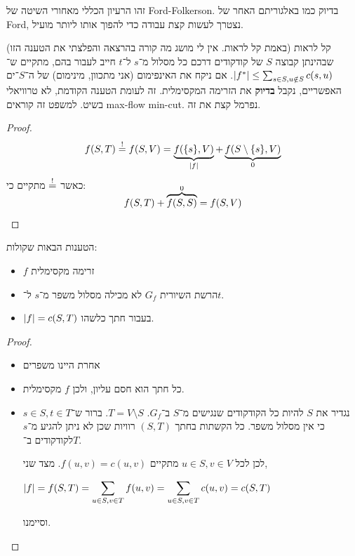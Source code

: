 \documentclass[]{../../../../tex/classes/styledArticle}
\begin{document}
	זהו הרעיון הכללי מאחורי השיטה של Ford-Folkerson. בדיוק כמו באלגוריתם האחר של Ford, נצטרך לעשות קצת עבודה כדי להפוך אותו ליותר מועיל. 
	
	קל לראות (באמת קל לראות. אין לי מושג מה קורה בהרצאה והפלצתי את הטענה הזו) שבהינתן קבוצה $S$ של קודקודים דרכם כל מסלול מ־$s$ ל־$t$ חייב לעבור בהם, מתקיים ש־$\left \lvert f^* \right \rvert \le \sum_{s \in S, u \notin S} c(s, u)$. 
	אם ניקח את האינפימום (אני מתכוון, מינימום) של ה־$S$־ים האפשריים, נקבל \textbf{בדיוק} את הזרימה המקסימלית. זה לעומת הטענה הקודמת, לא טרוויאלי בשיט. למשפט זה קוראים max-flow min-cut. נפרמל קצת את זה. 
	
	\begin{proof}
		\[ f(S, T) \overset{!}{=} f(S, V) = \underbrace{f(\{s\}, V)}_{\left \lvert f \right \rvert} + \underbrace{f(S \setminus \{s\}, V)}_{0} \]
		כאשר $\overset{!}{=}$ מתקיים כי: 
		\[ f(S, T) + \smash{\overbrace{f(S, S)}^{0}} = f(S, V) \]
	\end{proof}
	\begin{Theorem}
		הטענות הבאות שקולות: 
		\begin{itemize}
			\item $f$ זרימה מקסימלית
			\item הרשת השיורית $G_f$ לא מכילה מסלול משפר מ־$s$ ל־$t$. 
			\item $\left \lvert f \right \rvert = c(S, T)$ בעבור חתך כלשהו. 
		\end{itemize}
	\end{Theorem}
	\begin{proof}\,
		\begin{itemize}
			\item[$1 \implies 2$]אחרת היינו משפרים
			\item[$3 \implies 1$]כל חתך הוא חסם עליון, ולכן $f$ מקסימלית. 
			\item[$2 \implies 3$]נגדיר את $S$ להיות כל הקודקודים שנגישים מ־$S$ ב־$G_f$. $T = V \setminus S$. ברור ש־$s \in S, t \in T$ כי אין מסלול משפר. כל הקשתות בחתך $(S, T)$ רוויות שכן לא ניתן להגיע מ־$s$ לקודקודים ב־$T$. 
			
			לכן לכל $u \in S, v \in V$ מתקיים $f(u, v) = c(u, v)$. מצד שני, 
			
			\hfil $\displaystyle \left \lvert f \right \rvert = f(S, T) = \sum_{u \in S, v \in T} f(u, v) = \sum_{u \in S, v \in T}c(u, v) = c(S, T)$
			
			וסיימנו. 
		\end{itemize}
	\end{proof}
	
\end{document}
